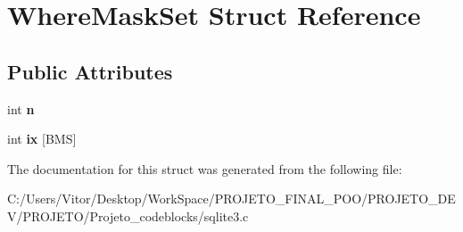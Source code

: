 \hypertarget{struct_where_mask_set}{\section{Where\-Mask\-Set Struct Reference}
\label{struct_where_mask_set}
}
\subsection*{Public Attributes}
\begin{DoxyCompactItemize}
\item 
\hypertarget{struct_where_mask_set_a09923e1dee2157c78c5ae0df65e8ee7c}{int {\bfseries n}}\label{struct_where_mask_set_a09923e1dee2157c78c5ae0df65e8ee7c}

\item 
\hypertarget{struct_where_mask_set_a9de4e7b27d4f793f37c1ead7b44ecb48}{int {\bfseries ix} \mbox{[}B\-M\-S\mbox{]}}\label{struct_where_mask_set_a9de4e7b27d4f793f37c1ead7b44ecb48}

\end{DoxyCompactItemize}


The documentation for this struct was generated from the following file\-:\begin{DoxyCompactItemize}
\item 
C\-:/\-Users/\-Vitor/\-Desktop/\-Work\-Space/\-P\-R\-O\-J\-E\-T\-O\-\_\-\-F\-I\-N\-A\-L\-\_\-\-P\-O\-O/\-P\-R\-O\-J\-E\-T\-O\-\_\-\-D\-E\-V/\-P\-R\-O\-J\-E\-T\-O/\-Projeto\-\_\-codeblocks/sqlite3.\-c\end{DoxyCompactItemize}

